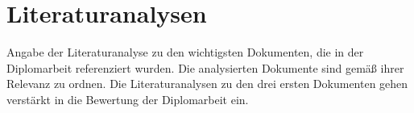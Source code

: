 \section{Literaturanalysen}

Angabe der Literaturanalyse zu den wichtigsten Dokumenten, die in der Diplomarbeit referenziert wurden. Die analysierten Dokumente sind gemäß ihrer Relevanz zu ordnen. Die Literaturanalysen zu den drei ersten Dokumenten gehen verstärkt in die Bewertung der Diplomarbeit ein.




